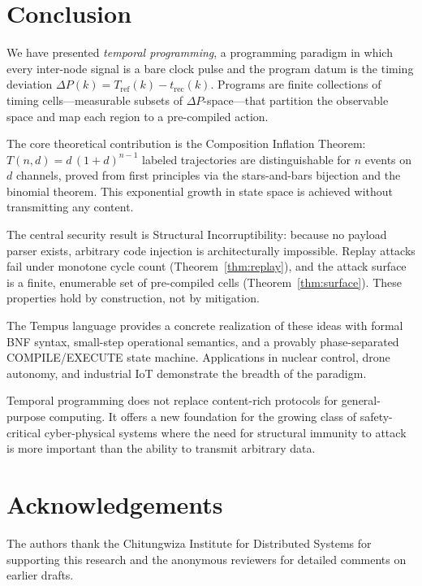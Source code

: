 \documentclass[twocolumn,10pt]{article}
\newcommand{\DP}{\Delta P}          %
\newcommand{\Tref}{T_{\mathrm{ref}}}
\newcommand{\trec}{t_{\mathrm{rec}}}
\begin{document}
\section{Conclusion}
\label{sec:conclusion}

We have presented \emph{temporal programming}, a programming paradigm
in which every inter-node signal is a bare clock pulse and the program
datum is the timing deviation $\DP(k) = \Tref(k) - \trec(k)$.
Programs are finite collections of timing cells---measurable subsets
of $\DP$-space---that partition the observable space and map each
region to a pre-compiled action.

The core theoretical contribution is the Composition Inflation
Theorem: $T(n,d) = d\,(1+d)^{n-1}$ labeled trajectories are
distinguishable for $n$ events on $d$ channels, proved from first
principles via the stars-and-bars bijection and the binomial theorem.
This exponential growth in state space is achieved without transmitting
any content.

The central security result is Structural Incorruptibility: because no
payload parser exists, arbitrary code injection is architecturally
impossible. Replay attacks fail under monotone cycle count
(Theorem~\ref{thm:replay}), and the attack surface is a finite,
enumerable set of pre-compiled cells (Theorem~\ref{thm:surface}).
These properties hold by construction, not by mitigation.

The Tempus language provides a concrete realization of these ideas
with formal BNF syntax, small-step operational semantics, and a
provably phase-separated COMPILE/EXECUTE state machine. Applications
in nuclear control, drone autonomy, and industrial IoT demonstrate
the breadth of the paradigm.

Temporal programming does not replace content-rich protocols for
general-purpose computing. It offers a new foundation for the
growing class of safety-critical cyber-physical systems where
the need for structural immunity to attack is more important than
the ability to transmit arbitrary data.

\section*{Acknowledgements}
The authors thank the Chitungwiza Institute for Distributed Systems
for supporting this research and the anonymous reviewers for detailed
comments on earlier drafts.



\end{document}
